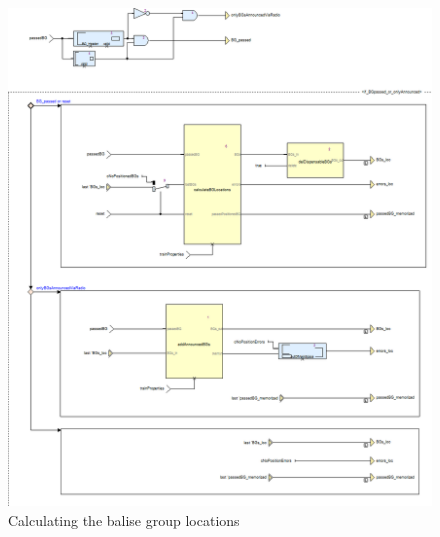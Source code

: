 \begin{figure}[hbtp]
\centering
\includegraphics[scale=0.5]{../images/calculateTrainPosition_calcBGs.png}
\caption{Calculating the balise group locations}
\end{figure}

